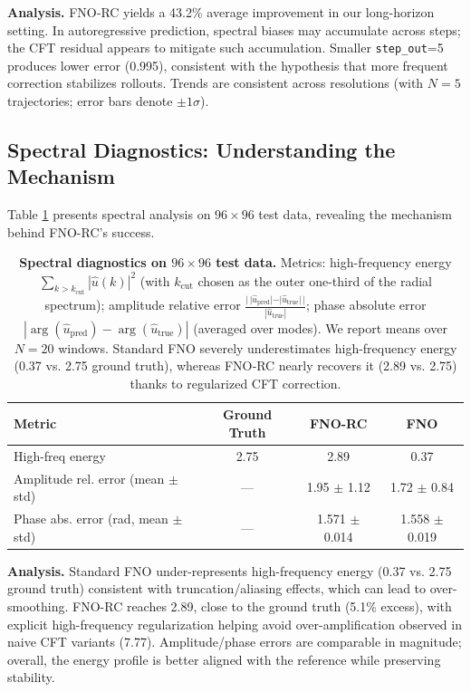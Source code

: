 \documentclass[11pt]{article}
\begin{document}
\textbf{Analysis.} FNO‑RC yields a 43.2\% average improvement in our long-horizon setting. In autoregressive prediction, spectral biases may accumulate across steps; the CFT residual appears to mitigate such accumulation. Smaller \texttt{step\_out}=5 produces lower error (0.995), consistent with the hypothesis that more frequent correction stabilizes rollouts. Trends are consistent across resolutions (with $N=5$ trajectories; error bars denote $\pm1\sigma$).

\subsection{Spectral Diagnostics: Understanding the Mechanism}
\label{sec:spectral}

Table \ref{tab:spectrum} presents spectral analysis on $96 \times 96$ test data, revealing the mechanism behind FNO-RC's success.

\begin{table}[h]
\centering
\caption{\textbf{Spectral diagnostics on $96 \times 96$ test data.} Metrics: high-frequency energy $\sum_{k>k_{\mathrm{cut}}}|\hat u(k)|^2$ (with $k_{\mathrm{cut}}$ chosen as the outer one-third of the radial spectrum); amplitude relative error $\frac{|\,|\hat u_{\mathrm{pred}}|-|\hat u_{\mathrm{true}}|\,|}{|\hat u_{\mathrm{true}}|}$; phase absolute error $|\arg(\hat u_{\mathrm{pred}})-\arg(\hat u_{\mathrm{true}})|$ (averaged over modes). We report means over $N=20$ windows. Standard FNO severely underestimates high-frequency energy (0.37 vs. 2.75 ground truth), whereas FNO‑RC nearly recovers it (2.89 vs. 2.75) thanks to regularized CFT correction.}
\label{tab:spectrum}
\small
\begin{tabular}{@{}lccc@{}}
\toprule
\textbf{Metric} & \textbf{Ground Truth} & \textbf{FNO-RC} & \textbf{FNO} \\
\midrule
High-freq energy & 2.75 & 2.89 & 0.37 \\
Amplitude rel. error (mean $\pm$ std) & --- & 1.95 $\pm$ 1.12 & 1.72 $\pm$ 0.84 \\
Phase abs. error (rad, mean $\pm$ std) & --- & 1.571 $\pm$ 0.014 & 1.558 $\pm$ 0.019 \\
\bottomrule
\end{tabular}
\end{table}

\textbf{Analysis.} Standard FNO under-represents high-frequency energy (0.37 vs. 2.75 ground truth) consistent with truncation/aliasing effects, which can lead to over-smoothing. FNO-RC reaches 2.89, close to the ground truth (5.1\% excess), with explicit high-frequency regularization helping avoid over-amplification observed in naive CFT variants (7.77). Amplitude/phase errors are comparable in magnitude; overall, the energy profile is better aligned with the reference while preserving stability.
\end{document}
